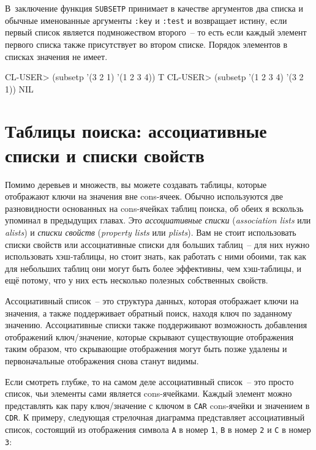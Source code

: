 В~заключение функция \lstinline{SUBSETP} принимает в качестве аргументов два списка и обычные
именованные аргументы \lstinline{:key} и \lstinline{:test} и возвращает истину, если первый список
является подмножеством второго~-- то есть если каждый элемент первого списка также
присутствует во втором списке.  Порядок элементов в списках значения не имеет.

\begin{myverb}
CL-USER> (subsetp '(3 2 1) '(1 2 3 4))
T
CL-USER> (subsetp '(1 2 3 4) '(3 2 1))
NIL
\end{myverb}


\section{Таблицы поиска: ассоциативные списки и списки свойств}

Помимо деревьев и множеств, вы можете создавать таблицы, которые отображают ключи на
значения вне cons-ячеек. Обычно используются две разновидности основанных на cons-ячейках
таблиц поиска, об обеих я вскользь упоминал в предыдущих главах. Это \textit{ассоциативные
  списки} (\textit{association lists} или \textit{alists}) и \textit{списки свойств}
(\textit{property lists} или \textit{plists}). Вам не стоит использовать списки свойств
или ассоциативные списки для больших таблиц~-- для них нужно использовать хэш-таблицы, но
стоит знать, как работать с ними обоими, так как для небольших таблиц они могут быть более
эффективны, чем хэш-таблицы, и ещё потому, что у них есть несколько полезных собственных
свойств.
 
Ассоциативный список~-- это структура данных, которая отображает ключи на значения, а также
поддерживает обратный поиск, находя ключ по заданному значению. Ассоциативные списки также
поддерживают возможность добавления отображений ключ/значение, которые скрывают
существующие отображения таким образом, что скрывающие отображения могут быть позже
удалены и первоначальные отображения снова станут видимы.

Если смотреть глубже, то на самом деле ассоциативный список~-- это просто список, чьи
элементы сами является cons-ячейками. Каждый элемент можно представлять как пару
ключ/значение с ключом в \lstinline{CAR} cons-ячейки и значением в \lstinline{CDR}. К примеру,
следующая стрелочная диаграмма представляет ассоциативный список, состоящий из отображения
символа \lstinline{A} в номер \lstinline{1}, \lstinline{B} в номер \lstinline{2} и \lstinline{C} в номер \lstinline{3}:

